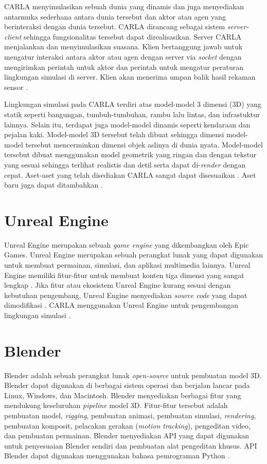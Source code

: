 CARLA menyimulasikan sebuah dunia yang dinamis dan juga menyediakan antarmuka
sederhana antara dunia tersebut dan aktor atau agen yang berinteraksi dengan
dunia tersebut. CARLA dirancang sebagai sistem \textit{server-client} sehingga
fungsionalitas tersebut dapat direalisasikan. Server CARLA menjalankan dan
menyimulasikan suasana. Klien bertanggung jawab untuk mengatur interaksi antara
aktor atau agen dengan server via \textit{socket} dengan mengirimkan perintah
untuk aktor dan perintah untuk mengatur peraturan lingkungan simulasi di server.
Klien akan menerima umpan balik hasil rekaman sensor
\parencite{carla-dosovitskiy}.

Lingkungan simulasi pada CARLA terdiri atas model-model 3 dimensi (3D) yang
statik seperti bangungan, tumbuh-tumbuhan, rambu lalu lintas, dan infrastuktur
lainnya. Selain itu, terdapat juga model-model dinamis seperti kendaraan dan
pejalan kaki. Model-model 3D tersebut telah dibuat sehingga dimensi model-model
tersebut mencerminkan dimensi objek aslinya di dunia nyata. Model-model tersebut
dibuat menggunakan model geometrik yang ringan dan dengan tekstur yang sesuai
sehingga terlihat realistis dan detil serta dapat di-\textit{render} dengan
cepat. Aset-aset yang telah disediakan CARLA sangat dapat disesuaikan
\parencite{carla-dosovitskiy}. Aset baru juga dapat ditambahkan
\parencite{carla-documentation-intro}.

\section{Unreal Engine}
Unreal Engine merupakan sebuah \textit{game engine} yang dikembangkan oleh Epic
Games. Unreal Engine merupakan sebuah perangkat lunak yang dapat digunakan untuk
membuat permainan, simulasi, dan aplikasi multimedia lainnya. Unreal Engine
memiliki fitur-fitur untuk membuat konten tiga dimensi yang sangat lengkap
\parencite{ue-5}. Jika fitur atau ekosistem Unreal Engine kurang sesuai dengan
kebutuhan pengembang, Unreal Engine menyediakan \textit{source code} yang dapat
dimodifikasi \parencite{ue-4}. CARLA menggunakan Unreal Engine untuk
pengembangan lingkungan simulasi \parencite{carla-documentation-build}.

\section{Blender}
Blender adalah sebuah perangkat lunak \textit{open-source} untuk pembuatan model
3D. Blender dapat digunakan di berbagai sistem operasi dan berjalan lancar pada
Linux, Windows, dan Macintosh. Blender menyediakan berbagai fitur yang mendukung
keseluruhan \textit{pipeline} model 3D. Fitur-fitur tersebut adalah pembuatan
model, \textit{rigging}, pembuatan animasi, pembuatan simulasi,
\textit{rendering}, pembuatan komposit, pelacakan gerakan (\textit{motion
tracking}), pengeditan video, dan pembuatan permainan. Blender menyediakan API
yang dapat digunakan untuk penyesuaian Blender sendiri dan pembuatan alat
pengeditan khusus. API Blender dapat digunakan menggunakan bahasa pemrograman
Python \parencite{blender-about}.

